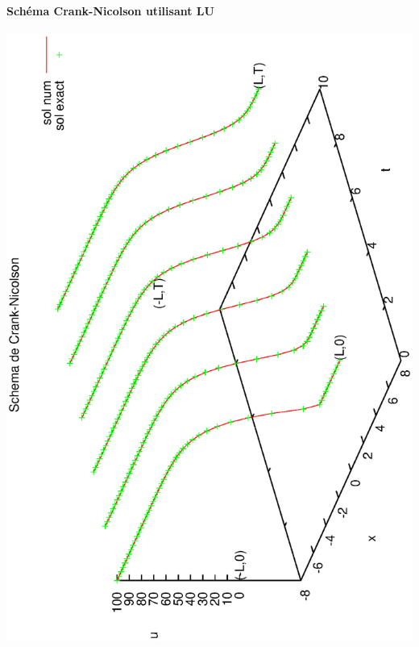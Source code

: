 \documentclass{book}
\begin{document}
\paragraph{Schéma Crank-Nicolson utilisant LU}
\begin{center}
\includegraphics[angle=-90, scale=0.40]{Crank-Nicolson}%
\end{center}
\end{document}

